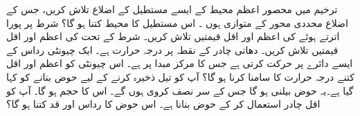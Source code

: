 ترخیم   میں محصور  اعظم محیط کے  ایسے مستطیل کے اضلاع  تلاش کریں،  جس کے اضلاع محددی  محور کے متوازی ہوں ۔ اس مستطیل کا محیط کتنا ہو گا؟
شرط    پر پورا  اترتے ہوئے   کی اعظم اور اقل قیمتیں تلاش کریں۔
شرط  کے تحت  کی اعظم اور اقل قیمتیں تلاش کریں۔
 دھاتی چادر کے نقطہ  پر درجہ حرارت  ہے۔ ایک چیونٹی  رداس   کے ایسے  دائرے پر حرکت کرتی ہے جس کا مرکز مبدا پر ہے۔ اس چیونٹی کو اعظم اور اقل کتنے درجہ حرارت کا سامنا کرنا ہو گا؟ 
آپ کو  تیل ذخیرہ کرنے  کے لیے حوض  بنانے کو کہا گیا ہے۔یہ حوض بیلنی ہو گا جس کے  سر نصف کروی ہوں گے۔ اس کا حجم  ہو گا۔ آپ کو اقل  چادر استعمال کر کے حوض بنانا ہے۔ اس حوض کا رداس اور قد کتنا ہو گا؟ 

